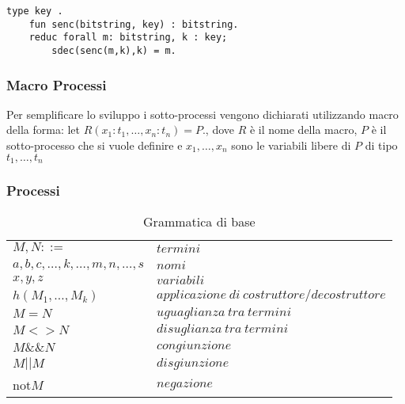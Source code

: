 \begin{lstlisting}[language=app]
    type key .
    fun senc(bitstring, key) : bitstring.
    reduc forall m: bitstring, k : key; 
        sdec(senc(m,k),k) = m.
\end{lstlisting}

\subsubsection*{Macro Processi}
Per semplificare lo sviluppo i sotto-processi vengono dichiarati utilizzando macro della forma: let $R(x_1:t_1,\dots,x_n:t_n) = P$., dove $R$ è il nome della macro, $P$ è il sotto-processo che si vuole definire e $x_1,\dots,x_n$ sono le variabili libere di $P$ di tipo $t_1,\dots,t_n$

\subsubsection*{Processi}

\begin{table}[h!]
    \begin{tabular}{ll}
        $M,N ::=$ & $termini$\\
        \quad$a, b, c, \dots , k, \dots , m, n, \dots , s$ & $nomi$\\
        \quad$x, y, z$ & $variabili$\\
        \quad$h(M_1, \dots , M_k)$ & $applicazione \: di \: costruttore/decostruttore$\\
        \quad $M=N$ & $uguaglianza \: tra \: termini$\\
        \quad $M<>N$ & $disuglianza \: tra \: termini$\\
        \quad $M\&\&N$ & $congiunzione$\\
        \quad $M||M$ & $disgiunzione$\\
        \quad not$M$ & $negazione$\\    
    \end{tabular}
    \caption{Grammatica di base}
    \label{tab:gb}
\end{table}

